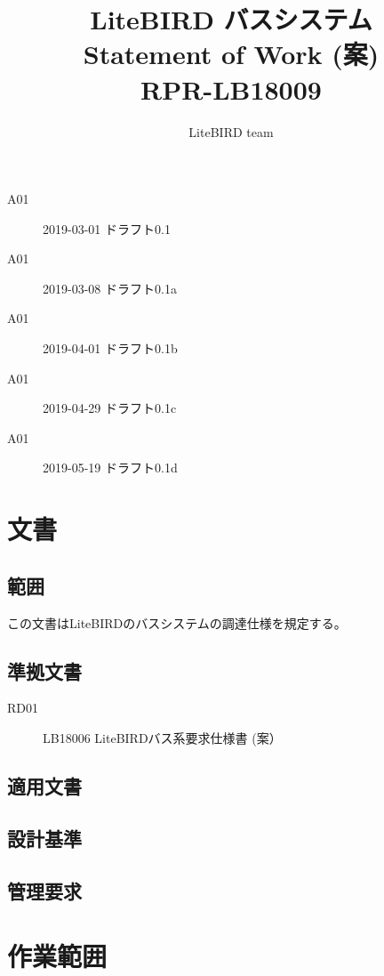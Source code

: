 \documentclass[xelatex,ja=standard]{bxjsarticle}
\title{LiteBIRD バスシステム \\
Statement of Work (案)\\
RPR-LB18009}
\author{LiteBIRD team}
\begin{document}
\maketitle

\vspace{80mm}
\begin{description}
\item [A01] 2019-03-01 ドラフト0.1
\item [A01] 2019-03-08 ドラフト0.1a
\item [A01] 2019-04-01 ドラフト0.1b
\item [A01] 2019-04-29 ドラフト0.1c
\item [A01] 2019-05-19 ドラフト0.1d
\end{description}

\newpage
\tableofcontents

\newpage

\section{文書}

\subsection{範囲}

この文書はLiteBIRDのバスシステムの調達仕様を規定する。
	
\subsection{準拠文書}

\begin{description}
\item [RD01] LB18006 LiteBIRDバス系要求仕様書 (案）
\end{description}

\subsection{適用文書}


\subsection{設計基準}
\subsection{管理要求}

\section{作業範囲}
\end{document}
